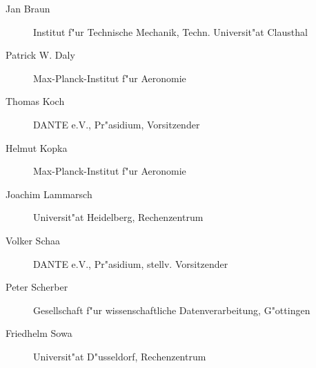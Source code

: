 \documentclass{article}
\begin{document}
\begin{description}
\item[Jan Braun] Institut f"ur Technische Mechanik, Techn. Universit"at
   Clausthal
\item[Patrick W. Daly] Max-Planck-Institut f"ur Aeronomie
\item[Thomas Koch] DANTE e.V., Pr"asidium, Vorsitzender
\item[Helmut Kopka] Max-Planck-Institut f"ur Aeronomie
\item[Joachim Lammarsch] Universit"at Heidelberg, Rechenzentrum
\item[Volker Schaa] DANTE e.V., Pr"asidium, stellv. Vorsitzender
\item[Peter Scherber] Gesellschaft f"ur wissenschaftliche Datenverarbeitung,
                      G"ottingen
\item[Friedhelm Sowa] Universit"at D"usseldorf, Rechenzentrum
\end{description}
\end{document}
